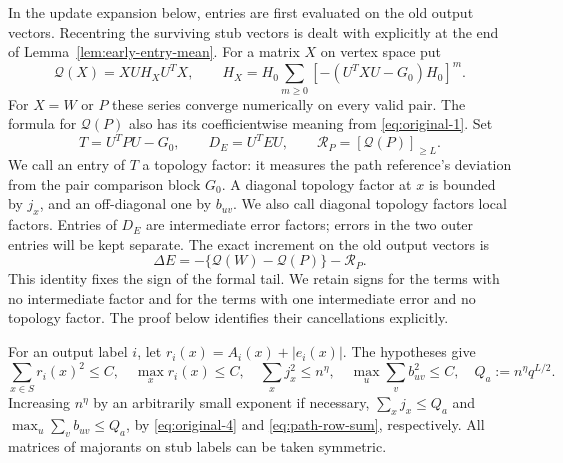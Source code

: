 In the update expansion below, entries are first evaluated on the old
output vectors. Recentring the surviving stub vectors is dealt with explicitly
at the end of Lemma~\ref{lem:early-entry-mean}.
For a matrix \(X\) on vertex space put
\[
 \mathcal Q(X)=XU H_X U^T X,\qquad
 H_X=H_0\sum_{m\ge0}[-(U^TXU-G_0)H_0]^m.
\]
For \(X=W\) or \(P\) these series converge numerically on every valid
pair. The formula for \(\mathcal Q(P)\) also has its coefficientwise
meaning from \eqref{eq:original-1}. Set
\[
 T=U^TPU-G_0,\qquad D_E=U^TEU,
 \qquad \mathcal R_P=[\mathcal Q(P)]_{\ge L}.
\]
We call an entry of \(T\) a topology factor: it measures the path
reference's deviation from the pair comparison block \(G_0\).
A diagonal topology factor at \(x\) is bounded by \(j_x\), and
an off-diagonal one by \(b_{uv}\). We also call diagonal topology
factors local factors. Entries of \(D_E\) are intermediate error
factors; errors in the two outer entries will be kept separate.
The exact increment on the old output vectors is
\[
 \Delta E=-\{\mathcal Q(W)-\mathcal Q(P)\}-\mathcal R_P.
\]
This identity fixes the sign of the formal tail. We retain signs for the
terms with no intermediate factor and for the terms with one
intermediate error and no topology factor. The proof below identifies
their cancellations explicitly.

For an output label \(i\), let
\(r_i(x)=A_i(x)+|e_i(x)|\). The hypotheses give
\[
 \sum_{x\in S}r_i(x)^2\le C,\quad
 \max_x r_i(x)\le C,\quad
 \sum_x j_x^2\le n^\eta,\quad
 \max_u\sum_v b_{uv}^2\le C,
 \quad Q_a:=n^\eta q^{L/2}.
\]
Increasing \(n^\eta\) by an arbitrarily small exponent if necessary,
\(\sum_xj_x\le Q_a\) and
\(\max_u\sum_v b_{uv}\le Q_a\), by
\eqref{eq:original-4} and \eqref{eq:path-row-sum}, respectively.
All matrices of majorants on stub labels can be taken symmetric.

